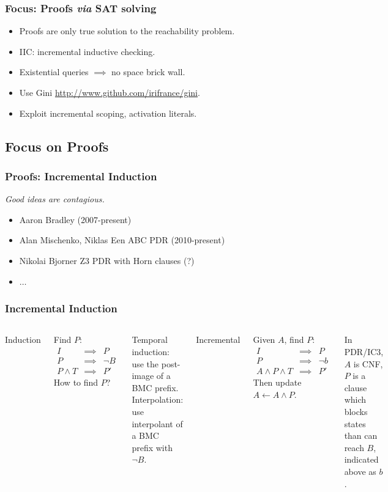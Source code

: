 \documentclass{beamer}
\begin{document}
\begin{frame}
	\frametitle{Focus: Proofs {\em via} SAT solving}
	\begin{itemize}
		\item Proofs are only true solution to the reachability problem.
		\item IIC: incremental inductive checking.
		\item Existential queries $\implies$ no space brick wall.
		\item Use Gini \url{http://www.github.com/irifrance/gini}.
		\item Exploit incremental scoping, activation literals.
	\end{itemize}
\end{frame}


\subsection{Focus on Proofs}
\begin{frame}
	\frametitle{Proofs: Incremental Induction}
	\begin{center}
		\em{Good ideas are contagious.}
	\end{center}
	\begin{itemize}
		\item Aaron Bradley (2007-present)
		\item Alan Mischenko, Niklas Een ABC PDR (2010-present)
		\item Nikolai Bjorner Z3 PDR with Horn clauses (?)
		\item $\ldots$
	\end{itemize}
\end{frame}

\begin{frame}
	\frametitle{Incremental Induction}
	\begin{columns}
		\begin{center}Induction\end{center}
		Find $P$:
		\begin{align*}
			I & \implies & P\\
			P & \implies & \neg B\\
			P \wedge T & \implies & P'
		\end{align*}
		How to find $P$?

		Temporal induction: use the post-image of a BMC prefix.\\
		Interpolation: use interpolant of a BMC prefix with $\neg B$.
		\begin{center}Incremental\end{center}
		Given $A$, find $P$:
		\begin{align*}
			I & \implies & P\\
			P & \implies & \neg b\\
			A \wedge P \wedge T & \implies & P'
		\end{align*}
		Then update $A \leftarrow A \wedge P$.

		In PDR/IC3, $A$ is CNF, $P$ is a clause which blocks
		states than can reach $B$, indicated above as $b$.
	\end{columns}
\end{frame}
\end{document}
